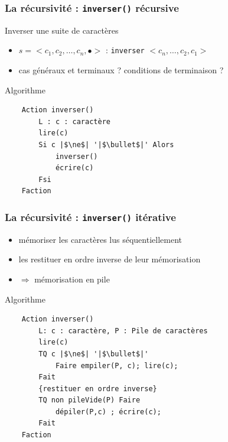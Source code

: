 \documentclass[table,handout,tikz,12pt,svgnames]{beamer}
\begin{document}
\begin{frame}[fragile=singleslide]
	\frametitle{La récursivité : \texttt{inverser()} récursive}
	\begin{block}{Inverser une suite de caractères} %
		\begin{itemize}
			\item $s=<c_1, c_2, \ldots, c_n, \bullet >$ : \texttt{inverser} $<c_n, \ldots, c_2, c_1>$
			\item cas généraux et terminaux ? conditions de terminaison ?
		\end{itemize}
	\end{block}
	\begin{block}{Algorithme} %
		\begin{verbatim}
	Action inverser()
		L : c : caractère
		lire(c)
		Si c |$\ne$| '|$\bullet$|' Alors
			inverser()
			écrire(c)
		Fsi
	Faction
		\end{verbatim}
	\end{block}
\end{frame}

\begin{frame}[fragile=singleslide]
	\frametitle{La récursivité : \texttt{inverser()} itérative}
	\vspace{-0.8cm}
	\begin{block}{}
		\begin{itemize}
			\item mémoriser les caractères lus séquentiellement
			\item les restituer en ordre inverse de leur mémorisation
			\item $\Rightarrow$ mémorisation en pile
		\end{itemize}
	\end{block}
	\begin{block}{Algorithme} %
		\begin{verbatim}
	Action inverser()
		L: c : caractère, P : Pile de caractères
		lire(c)
		TQ c |$\ne$| '|$\bullet$|'
			Faire empiler(P, c); lire(c);
		Fait
		{restituer en ordre inverse}
		TQ non pileVide(P) Faire
			dépiler(P,c) ; écrire(c);
		Fait
	Faction
		\end{verbatim}
	\end{block}
\end{frame}
\end{document}
